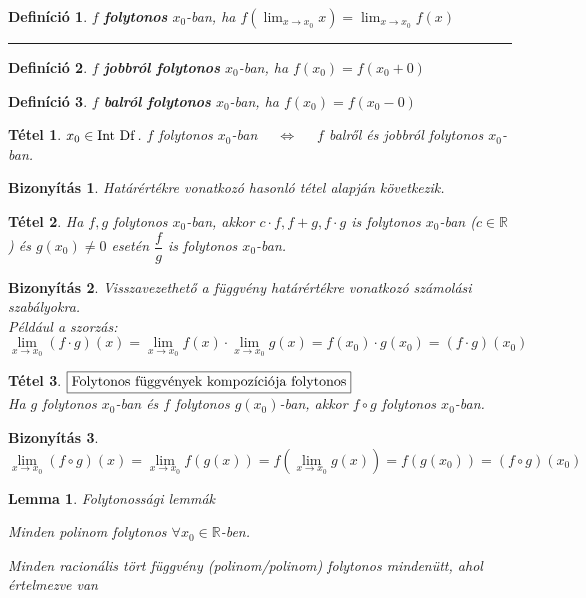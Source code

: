 \documentclass[a4paper,12pt,twoside]{book}
\newtheorem{tetel}{Tétel}[chapter]
\newtheorem{defi}{Definíció}[chapter]
\newtheorem{lemma}{Lemma}[chapter]
\theoremstyle{break}
\newtheorem{biz}{Bizonyítás}[chapter]
\theoremstyle{plain}
\begin{document}
\begin{defi}
 $f$ \textbf{folytonos} $x_0$-ban, ha $\displaystyle f\left(\lim_{x\to x_0} x\right) = \lim_{x\to x_0} f(x)$
\end{defi}

\hspace*{0.25\textwidth}\rule{0.5\textwidth}{0.5pt}

\begin{defi}
 $f$ \textbf{jobbról folytonos} $x_0$-ban, ha $f(x_0) = f(x_0+0)$
\end{defi}

\begin{defi}
 $f$ \textbf{balról folytonos} $x_0$-ban, ha $f(x_0) = f(x_0-0)$
\end{defi}

\begin{tetel}
 $x_0 \in \rm{Int~Df}$. $f$ folytonos $x_0$-ban $\quad\Leftrightarrow\quad$ $f$ balről és jobbról folytonos $x_0$-ban.
\end{tetel}
\begin{biz}
 Határértékre vonatkozó hasonló tétel alapján következik.
\end{biz}

\begin{tetel}
 Ha $f, g$ folytonos $x_0$-ban, akkor $c\cdot f, f+g, f\cdot g$ is folytonos $x_0$-ban ($c\in\mathbb{R}$) és $g(x_0)\neq 0$ esetén $\dfrac{f}{g}$ is folytonos $x_0$-ban.
\end{tetel}
\begin{biz}
 Visszavezethető a függvény határértékre vonatkozó számolási szabályokra.\\
 Például a szorzás:
 \[\lim_{x\to x_0} (f\cdot g)(x) = \lim_{x\to x_0} f(x)\cdot \lim_{x\to x_0} g(x) = f(x_0)\cdot g(x_0) = (f\cdot g)(x_0)\]
\end{biz}

\begin{tetel} $\boxed{$Folytonos függvények kompozíciója folytonos$}$\\
 Ha $g$ folytonos $x_0$-ban és $f$ folytonos $g(x_0)$-ban, akkor $f\circ g$ folytonos $x_0$-ban.
\end{tetel}
\begin{biz}
 \[\lim_{x\to x_0} (f\circ g)(x) = \lim_{x\to x_0} f(g(x)) = f(\lim_{x\to x_0} g(x)) = f(g(x_0)) = (f\circ g)(x_0)\]
\end{biz}

\begin{lemma} Folytonossági lemmák\\
\begin{itemize*}
 \item Minden polinom folytonos $\forall x_0\in\mathbb{R}$-ben.
 \item Minden racionális tört függvény (polinom/polinom) folytonos mindenütt, ahol értelmezve van
\end{itemize*}
\end{lemma}
\end{document}
